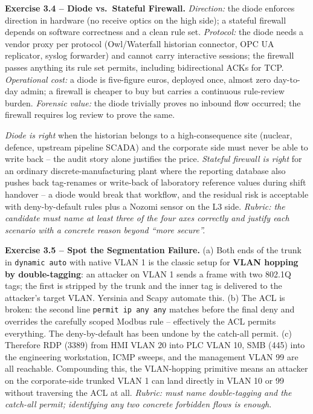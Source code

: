 \documentclass[11pt,a4paper]{article}
\begin{document}
\begin{solutionbox}
\textbf{Exercise 3.4 -- Diode vs.\ Stateful Firewall.}
\emph{Direction:} the diode enforces direction in hardware (no receive optics on the high side); a stateful firewall depends on software correctness and a clean rule set. \emph{Protocol:} the diode needs a vendor proxy per protocol (Owl/Waterfall historian connector, OPC UA replicator, syslog forwarder) and cannot carry interactive sessions; the firewall passes anything its rule set permits, including bidirectional ACKs for TCP. \emph{Operational cost:} a diode is five-figure euros, deployed once, almost zero day-to-day admin; a firewall is cheaper to buy but carries a continuous rule-review burden. \emph{Forensic value:} the diode trivially proves no inbound flow occurred; the firewall requires log review to prove the same.

\emph{Diode is right} when the historian belongs to a high-consequence site (nuclear, defence, upstream pipeline SCADA) and the corporate side must never be able to write back -- the audit story alone justifies the price. \emph{Stateful firewall is right} for an ordinary discrete-manufacturing plant where the reporting database also pushes back tag-renames or write-back of laboratory reference values during shift handover -- a diode would break that workflow, and the residual risk is acceptable with deny-by-default rules plus a Nozomi sensor on the L3 side. \emph{Rubric: the candidate must name at least three of the four axes correctly and justify each scenario with a concrete reason beyond ``more secure''.}
\end{solutionbox}

\begin{solutionbox}
\textbf{Exercise 3.5 -- Spot the Segmentation Failure.}
(a) Both ends of the trunk in \texttt{dynamic auto} with native VLAN 1 is the classic setup for \textbf{VLAN hopping by double-tagging}: an attacker on VLAN 1 sends a frame with two 802.1Q tags; the first is stripped by the trunk and the inner tag is delivered to the attacker's target VLAN. Yersinia and Scapy automate this.
(b) The ACL is broken: the second line \texttt{permit ip any any} matches before the final deny and overrides the carefully scoped Modbus rule -- effectively the ACL permits everything. The deny-by-default has been undone by the catch-all permit.
(c) Therefore RDP (3389) from HMI VLAN 20 into PLC VLAN 10, SMB (445) into the engineering workstation, ICMP sweeps, and the management VLAN 99 are all reachable. Compounding this, the VLAN-hopping primitive means an attacker on the corporate-side trunked VLAN 1 can land directly in VLAN 10 or 99 without traversing the ACL at all. \emph{Rubric: must name double-tagging \emph{and} the catch-all permit; identifying any two concrete forbidden flows is enough.}
\end{solutionbox}
\end{document}
